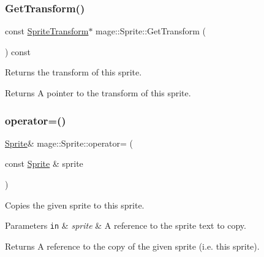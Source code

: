 \subsubsection{\texorpdfstring{Get\+Transform()}{GetTransform()}\hspace{0.1cm}{\footnotesize\ttfamily [2/2]}}
{\footnotesize\ttfamily const \hyperlink{classmage_1_1_sprite_transform}{Sprite\+Transform}$\ast$ mage\+::\+Sprite\+::\+Get\+Transform (\begin{DoxyParamCaption}{ }\end{DoxyParamCaption}) const\hspace{0.3cm}{\ttfamily [noexcept]}}

Returns the transform of this sprite.

\begin{DoxyReturn}{Returns}
A pointer to the transform of this sprite. 
\end{DoxyReturn}
\hypertarget{classmage_1_1_sprite_aa24dfc716d8b79cc16b4c27409f8cc6b}{}\label{classmage_1_1_sprite_aa24dfc716d8b79cc16b4c27409f8cc6b} 
\subsubsection{\texorpdfstring{operator=()}{operator=()}\hspace{0.1cm}{\footnotesize\ttfamily [1/2]}}
{\footnotesize\ttfamily \hyperlink{classmage_1_1_sprite}{Sprite}\& mage\+::\+Sprite\+::operator= (\begin{DoxyParamCaption}\item[{const \hyperlink{classmage_1_1_sprite}{Sprite} \&}]{sprite }\end{DoxyParamCaption})\hspace{0.3cm}{\ttfamily [delete]}}

Copies the given sprite to this sprite.


\begin{DoxyParams}[1]{Parameters}
\mbox{\tt in}  & {\em sprite} & A reference to the sprite text to copy. \\
\hline
\end{DoxyParams}
\begin{DoxyReturn}{Returns}
A reference to the copy of the given sprite (i.\+e. this sprite). 
\end{DoxyReturn}
\hypertarget{classmage_1_1_sprite_a808d87aeb6d652f9a53e967a75a1eede}{}\label{classmage_1_1_sprite_a808d87aeb6d652f9a53e967a75a1eede} 
